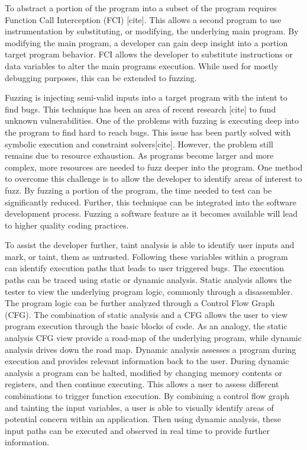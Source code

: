 \documentclass[conference]{IEEEtran}
\begin{document}
To abstract a portion of the program into a subset of the program requires Function Call Interception (FCI) [cite]. This allows a second program to use instrumentation by substituting, or modifying, the underlying main program. By modifying the main program, a developer can gain deep insight into a portion target program behavior. FCI allows the developer to substitute instructions or data variables to alter the main programs execution. While used for mostly debugging purposes, this can be extended to fuzzing.

Fuzzing is injecting semi-valid inputs into a target program with the intent to find bugs. This technique has been an area of recent research [cite] to fund unknown vulnerabilities. One of the problems with fuzzing is executing deep into the program to find hard to reach bugs. This issue has been partly solved with symbolic execution and constraint solvers[cite]. However, the problem still remains due to resource exhaustion. As programs become larger and more complex, more resources are needed to fuzz deeper into the program. One method to overcome this challenge is to allow the developer to identify areas of interest to fuzz. By fuzzing a portion of the program, the time needed to test can be significantly reduced. Further, this technique can be integrated into the software development process. Fuzzing a software feature as it becomes available will lead to higher quality coding practices. 

To assist the developer further, taint analysis is able to identify user inputs and mark, or taint, them as untrusted. Following these variables within a program can identify execution paths that leads to user triggered bugs. The execution paths can be traced using static or dynamic analysis. Static analysis allows the tester to view the underlying program logic, commonly through a disassembler. The program logic can be further analyzed through a Control Flow Graph (CFG). The combination of static analysis and a CFG allows the user to view program execution through the basic blocks of code. As an analogy, the static analysis CFG view provide a road-map of the underlying program, while dynamic analysis drives down the road map. Dynamic analysis assesses a program during execution and provides relevant information back to the user. During dynamic analysis a program can be halted, modified by changing memory contents or registers, and then continue executing. This allows a user to assess different combinations to trigger function execution. By combining a control flow graph and tainting the input variables, a user is able to visually identify areas of potential concern within an application. Then using dynamic analysis, these input paths can be executed and observed in real time to provide further information. 
\end{document}
